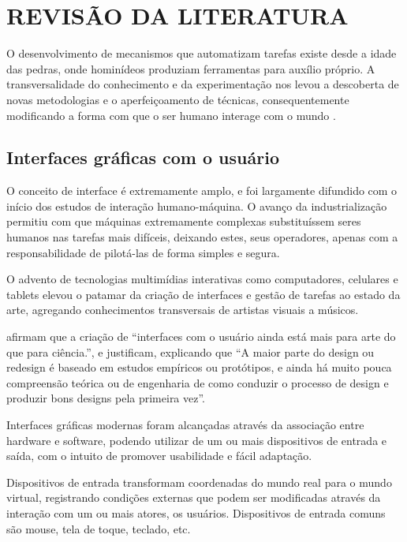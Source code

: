 \chapter{REVISÃO DA LITERATURA}

O desenvolvimento de mecanismos que automatizam tarefas existe desde a idade das
pedras, onde hominídeos produziam ferramentas para auxílio próprio. A
transversalidade do conhecimento e da experimentação nos levou a descoberta de
novas metodologias e o aperfeiçoamento de técnicas, consequentemente modificando
a forma com que o ser humano interage com o mundo
\cite[p. 1]{sartori2010neurociencia}.

\section{Interfaces gráficas com o usuário}

O conceito de interface é extremamente amplo, e foi largamente difundido com o
início dos estudos de interação humano-máquina. O avanço da industrialização
permitiu com que máquinas extremamente complexas substituíssem seres humanos nas
tarefas mais difíceis, deixando estes, seus operadores, apenas com a
responsabilidade de pilotá-las de forma simples e segura.

O advento de tecnologias multimídias interativas como computadores, celulares e
tablets elevou o patamar da criação de interfaces e gestão de tarefas ao estado
da arte, agregando conhecimentos transversais de artistas visuais a músicos.

 afirmam que a criação de ``interfaces
com o usuário ainda está mais para arte do que para ciência.'', e justificam,
explicando que ``A maior parte do design ou redesign é baseado em estudos
empíricos ou protótipos, e ainda há muito pouca compreensão teórica ou de
engenharia de como conduzir o processo de design e produzir bons designs pela
primeira vez''.

Interfaces gráficas modernas foram alcançadas através da associação entre
hardware e software, podendo utilizar de um ou mais dispositivos de entrada e
saída, com o intuito de promover usabilidade e fácil adaptação.

Dispositivos de entrada transformam coordenadas do mundo real para o mundo
virtual, registrando condições externas que podem ser modificadas através da
interação com um ou mais atores, os usuários. Dispositivos de entrada comuns são
mouse, tela de toque, teclado, etc.

